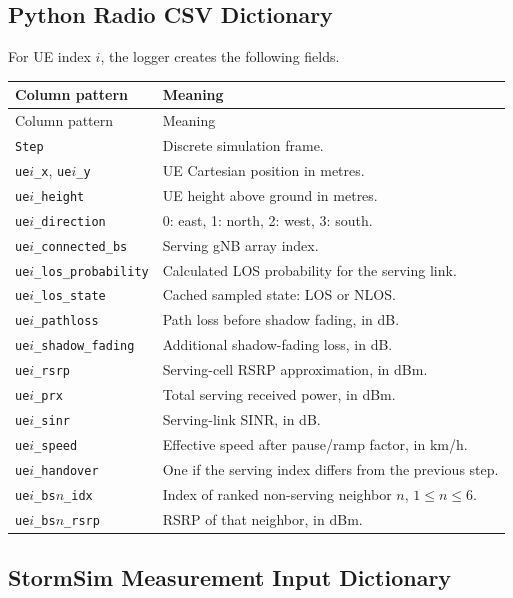 \subsection{Python Radio CSV Dictionary}

For UE index \(i\), the logger creates the following fields.

\begin{longtable}{p{4.6cm}p{9.3cm}}
\toprule
Column pattern & Meaning\\
\midrule
\endfirsthead
\toprule
Column pattern & Meaning\\
\midrule
\endhead
\texttt{Step} & Discrete simulation frame.\\
\texttt{ue\(i\)\_x}, \texttt{ue\(i\)\_y} & UE Cartesian position in metres.\\
\texttt{ue\(i\)\_height} & UE height above ground in metres.\\
\texttt{ue\(i\)\_direction} & 0: east, 1: north, 2: west, 3: south.\\
\texttt{ue\(i\)\_connected\_bs} & Serving gNB array index.\\
\texttt{ue\(i\)\_los\_probability} & Calculated LOS probability for the serving link.\\
\texttt{ue\(i\)\_los\_state} & Cached sampled state: LOS or NLOS.\\
\texttt{ue\(i\)\_pathloss} & Path loss before shadow fading, in dB.\\
\texttt{ue\(i\)\_shadow\_fading} & Additional shadow-fading loss, in dB.\\
\texttt{ue\(i\)\_rsrp} & Serving-cell RSRP approximation, in dBm.\\
\texttt{ue\(i\)\_prx} & Total serving received power, in dBm.\\
\texttt{ue\(i\)\_sinr} & Serving-link SINR, in dB.\\
\texttt{ue\(i\)\_speed} & Effective speed after pause/ramp factor, in km/h.\\
\texttt{ue\(i\)\_handover} & One if the serving index differs from the previous step.\\
\texttt{ue\(i\)\_bs\(n\)\_idx} & Index of ranked non-serving neighbor \(n\), \(1\leq n\leq6\).\\
\texttt{ue\(i\)\_bs\(n\)\_rsrp} & RSRP of that neighbor, in dBm.\\
\bottomrule
\end{longtable}

\subsection{StormSim Measurement Input Dictionary}


